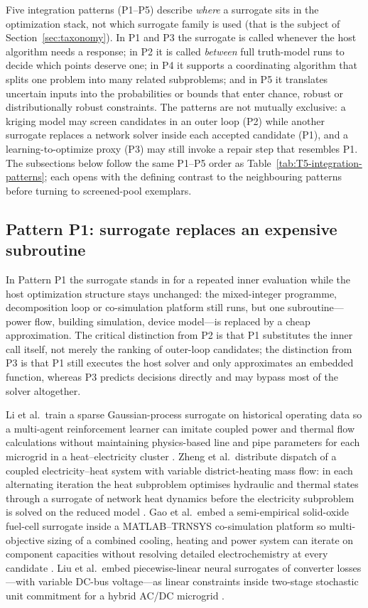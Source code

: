 Five integration patterns (P1--P5) describe \emph{where} a surrogate
sits in the optimization stack, not which surrogate family is used
(that is the subject of Section~\ref{sec:taxonomy}).
In P1 and P3 the surrogate is called whenever the host algorithm needs
a response; in P2 it is called \emph{between} full truth-model runs to
decide which points deserve one; in P4 it supports a coordinating
algorithm that splits one problem into many related subproblems; and in
P5 it translates uncertain inputs into the probabilities or bounds that
enter chance, robust or distributionally robust constraints.
The patterns are not mutually exclusive: a kriging model may screen
candidates in an outer loop (P2) while another surrogate replaces a
network solver inside each accepted candidate (P1), and a
learning-to-optimize proxy (P3) may still invoke a repair step that
resembles P1.
The subsections below follow the same P1--P5 order as
Table~\ref{tab:T5-integration-patterns}; each opens with the defining
contrast to the neighbouring patterns before turning to screened-pool
exemplars.

\subsection{Pattern P1: surrogate replaces an expensive subroutine}
\label{sec:int:replace}

In Pattern P1 the surrogate stands in for a repeated inner evaluation
while the host optimization structure stays unchanged: the mixed-integer
programme, decomposition loop or co-simulation platform still runs, but
one subroutine---power flow, building simulation, device model---is
replaced by a cheap approximation.
The critical distinction from P2 is that P1 substitutes the inner call
itself, not merely the ranking of outer-loop candidates; the
distinction from P3 is that P1 still executes the host solver and only
approximates an embedded function, whereas P3 predicts decisions
directly and may bypass most of the solver altogether.

Li et al.\ train a sparse Gaussian-process surrogate on historical
operating data so a multi-agent reinforcement learner can imitate
coupled power and thermal flow calculations without maintaining
physics-based line and pipe parameters for each microgrid in a
heat--electricity cluster \cite{Li2023__3}. Zheng et al.\ distribute
dispatch of a coupled electricity--heat system with variable
district-heating mass flow: in each alternating iteration the heat
subproblem optimises hydraulic and thermal states through a surrogate
of network heat dynamics before the electricity subproblem is solved on
the reduced model \cite{Zheng20231907}. Gao et al.\ embed a semi-empirical solid-oxide
fuel-cell surrogate inside a MATLAB--TRNSYS co-simulation platform so
multi-objective sizing of a combined cooling, heating and power system
can iterate on component capacities without resolving detailed
electrochemistry at every candidate \cite{Gao2025}. Liu et al.\ embed
piecewise-linear neural surrogates of converter losses---with variable
DC-bus voltage---as linear constraints inside two-stage stochastic
unit commitment for a hybrid AC/DC microgrid \cite{Liu20242534}.

